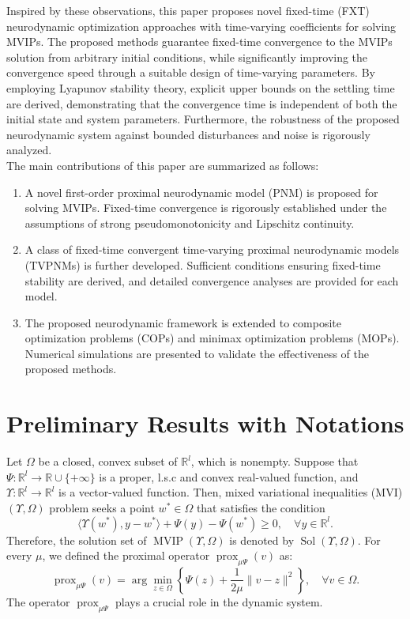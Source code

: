 \documentclass{article}
\theoremstyle{plain}%
\theoremstyle{thmstyletwo}%
\theoremstyle{thmstylethree}%
\begin{document}
Inspired by these observations, this paper proposes novel fixed-time (FXT) neurodynamic optimization approaches with time-varying coefficients for solving MVIPs. The proposed methods guarantee fixed-time convergence to the MVIPs solution from arbitrary initial conditions, while significantly improving the convergence speed through a suitable design of time-varying parameters. By employing Lyapunov stability theory, explicit upper bounds on the settling time are derived, demonstrating that the convergence time is independent of both the initial state and system parameters. Furthermore, the robustness of the proposed neurodynamic system against bounded disturbances and noise is rigorously analyzed.\\
\noindent
The main contributions of this paper are summarized as follows:\\
\noindent
\begin{enumerate}
\item A novel first-order proximal neurodynamic model (PNM) is proposed for solving MVIPs. Fixed-time convergence is rigorously established under the assumptions of strong pseudomonotonicity and Lipschitz continuity.
\item A class of fixed-time convergent time-varying proximal neurodynamic models (TVPNMs) is further developed. Sufficient conditions ensuring fixed-time stability are derived, and detailed convergence analyses are provided for each model.
\item The proposed neurodynamic framework is extended to composite optimization problems (COPs) and minimax optimization problems (MOPs). Numerical simulations are presented to validate the effectiveness
of the proposed methods.
\end{enumerate}
\section{Preliminary Results with Notations}\label{p3sec2}
 Let $\Omega$ be a closed, convex subset of $\mathbb{R}^l$, which is nonempty. Suppose that $\Psi : \mathbb{R}^l \rightarrow \mathbb{R} \cup \{+\infty\}$ is a proper, l.s.c and convex real-valued function, and $\Upsilon : \mathbb{R}^l \rightarrow \mathbb{R}^l$ is a vector-valued function. Then, mixed variational inequalities (MVI) $(\Upsilon, \Omega)$ problem seeks a point $w^* \in \Omega$ that satisfies the condition 
\begin{equation}\label{MV}
    \langle \Upsilon(w^*), y - w^* \rangle + \Psi(y) - \Psi(w^*) \geq 0, \quad \forall y \in \mathbb{R}^l.
\end{equation}
Therefore, the solution set of \(\operatorname{MVIP}(\Upsilon, \Omega )\) is denoted by \(\operatorname{Sol}(\Upsilon, \Omega)\). For every $\mu$, we defined the proximal operator $\operatorname{prox}_{\mu \Psi}(v)$ as:
\begin{equation}\label{eqproximal}
    \operatorname{prox}_{\mu \Psi}(v) = \arg\min_{z \in \Omega} \left\{ \Psi(z) + \frac{1}{2\mu} \|v - z\|^2 \right\},\quad\forall v\in\Omega.
\end{equation}
The operator $\operatorname{prox}_{\mu \Psi}$ plays a crucial role in the dynamic system.\\
\end{document}
